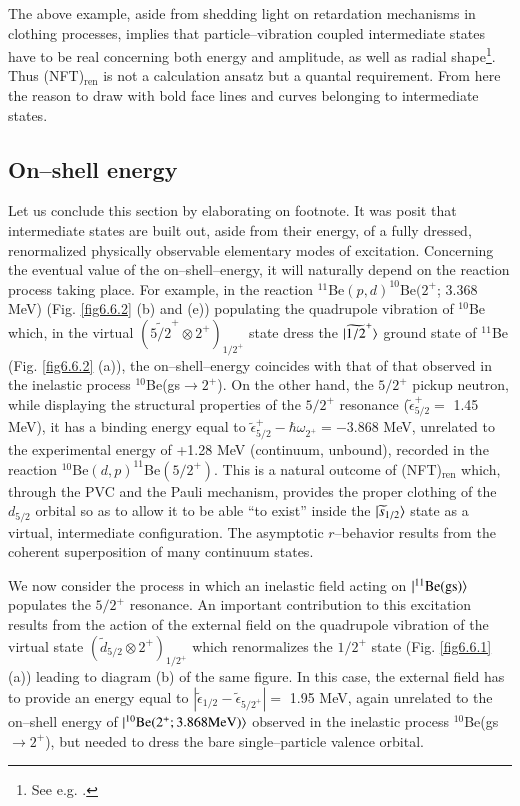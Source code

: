 The above example, aside from shedding light on retardation mechanisms in clothing processes, implies that particle--vibration coupled intermediate states have to be real concerning both energy and amplitude, as well as radial shape\footnote{See e.g. \cite{Barranco:17}.}. Thus (NFT)$_{\text{ren}}$ is not a calculation ansatz but a quantal requirement. From here the reason to draw with bold face lines and curves belonging to intermediate states.

\subsection{On--shell energy}
 Let us conclude this section by elaborating on footnote. It was posit that intermediate states are built out, aside from their energy, of a fully dressed, renormalized physically observable elementary modes of excitation. Concerning the eventual value of the on--shell--energy, it will naturally depend on the reaction process taking place.
For example, in the reaction $^{11}$Be$(p,d)^{10}$Be$(2^+$; 3.368 MeV) (Fig. \ref{fig6.6.2} (b) and (e)) populating the quadrupole vibration of $^{10}$Be which, in the virtual $(\widetilde{5/2}^+\otimes 2^+)_{1/2^+}$ state dress the $|{\widetilde{1/2}^+} \rangle$ ground state of $^{11}$Be (Fig. \ref{fig6.6.2} (a)), the on--shell--energy coincides with that of that observed in the inelastic process $^{10}$Be(gs$\to 2^+$). On the other hand, the $5/2^+$ pickup neutron, while displaying the structural properties of the $5/2^+$ resonance ($\tilde{\epsilon}_{5/2}^+=$ 1.45 MeV), it has a binding energy equal to $\tilde{\epsilon}_{5/2}^+-\hbar\omega_{2^+}=-3.868$ MeV, unrelated to the experimental energy of +1.28 MeV (continuum, unbound), recorded in the reaction $^{10}$Be$(d,p)^{11}$Be$(5/2^+)$. This is a natural outcome of (NFT)$_{\text{ren}}$ which, through the PVC and the Pauli mechanism, provides the proper clothing of the $d_{5/2}$ orbital so as to allow it to be able ``to exist'' inside the $|{\widetilde s_{1/2}} \rangle$ state as a virtual, intermediate configuration. The asymptotic $r$--behavior results from the coherent superposition of many continuum states.


 We now consider the process in which an inelastic field acting on $|{^{11}\text{Be(gs)}} \rangle$ populates the $5/2^+$ resonance. An important contribution to this excitation results from the action of the external field on the quadrupole vibration of the virtual state $(\tilde d_{5/2}\otimes 2^+)_{1/2^+}$ which renormalizes the $1/2^+$ state (Fig. \ref{fig6.6.1} (a)) leading to diagram (b) of the same figure. In this case, the external field has to provide an energy equal to $|\tilde \epsilon_{1/2}-\tilde \epsilon_{5/2^+}|=$ 1.95 MeV, again unrelated to the on--shell energy of $|{^{10}\text{Be}(2^+; 3.868\text{MeV})} \rangle$ observed in the inelastic process $^{10}$Be(gs$\to2^+$), but needed to dress the bare single--particle valence orbital.

